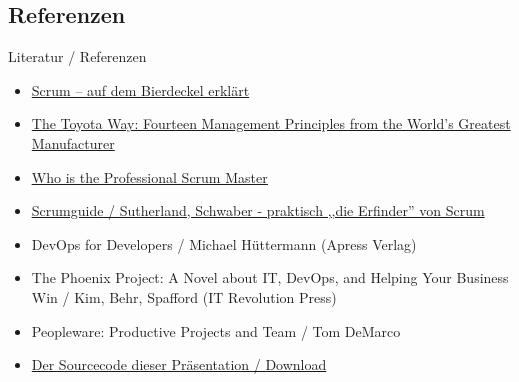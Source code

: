 \subsection{Referenzen}
\frame
{
   Literatur / Referenzen
    \bigskip
    \begin{itemize}
      \item{\href{http://dpunkt.de/material/Scrum/}{Scrum – auf dem Bierdeckel erklärt}}
      \item{\href{http://www.amazon.de/The-Toyota-Way-Management-Manufacturer/dp/0071392319}{The Toyota Way: Fourteen Management Principles from the World's Greatest Manufacturer}}
      \item{\href{http://blog.scrum.org/who-is-the-professional-scrum-master/}{\underline{Who is the Professional Scrum Master}}}
      \item{\href{http://www.scrumguides.org/scrum-guide.html}{\underline{Scrumguide} / Sutherland, Schwaber - praktisch ,,die Erfinder'' von Scrum}}
      \item{DevOps for Developers / Michael Hüttermann (Apress Verlag)}
      \item{The Phoenix Project: A Novel about IT, DevOps, and Helping Your Business Win / Kim, Behr, Spafford (IT Revolution Press)}
      \item{Peopleware: Productive Projects and Team / Tom DeMarco} 
      \item{\href{https://github.com/scoopex/agiles-arbeiten}{Der Sourcecode dieser Präsentation / Download}}
    \end{itemize}
}

